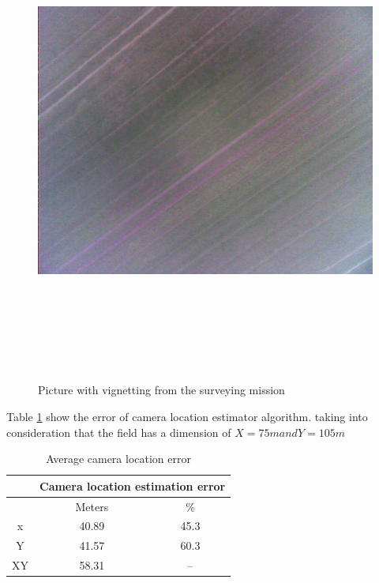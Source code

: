 \begin{figure}[H]
\centering
\includegraphics[width=16cm,height=16cm,keepaspectratio]{imagenes/IMG_62.png}
\caption{Picture with vignetting from the surveying mission}
\label{fig:vignetting}
\end{figure}
Table \ref{Talbe:XYerror} show the error of camera location estimator algorithm. taking into consideration that the field has a dimension of $X = 75 m and Y = 105 m$
\begin{table}[H]
\centering
\begin{tabular}{|c|c|c|}
\hline
   & \multicolumn{2}{c|}{Camera location estimation error} \\ \hline
   & Meters                     & \%                       \\ \hline
x  & 40.89                      & 45.3                     \\ \hline
Y  & 41.57                      & 60.3                     \\ \hline
XY & 58.31                      & --                       \\ \hline
\end{tabular}
\caption{Average camera location error}
\label{Talbe:XYerror}
\end{table}
